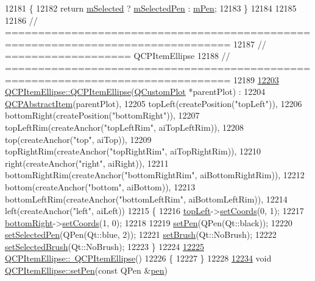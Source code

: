 \begin{DoxyCode}
12181 \textcolor{keyword}{}\{
12182   \textcolor{keywordflow}{return} \hyperlink{a00022_a4bdb3457dad1d268c0f78a44152b9645}{mSelected} ? \hyperlink{a00036_aff858ad6dde3b90024814ca4b116f278}{mSelectedPen} : \hyperlink{a00036_abbb544d5bb927dfe4e81a7f3ca4c65ac}{mPen};
12183 \}
12184 
12185 
12186 \textcolor{comment}{// ================================================================================}
12187 \textcolor{comment}{// =================== QCPItemEllipse}
12188 \textcolor{comment}{// ================================================================================}
12189 
\hypertarget{a00115_source_l12203}{}\hyperlink{a00035_a759b77ef002515eba0263b5447ecb3fb}{12203} \hyperlink{a00035_a759b77ef002515eba0263b5447ecb3fb}{QCPItemEllipse::QCPItemEllipse}(\hyperlink{a00030_d8/d00/a00186}{QCustomPlot} *parentPlot) :
12204   \hyperlink{a00022}{QCPAbstractItem}(parentPlot),
12205   topLeft(createPosition(\textcolor{stringliteral}{"topLeft"})),
12206   bottomRight(createPosition(\textcolor{stringliteral}{"bottomRight"})),
12207   topLeftRim(createAnchor(\textcolor{stringliteral}{"topLeftRim"}, aiTopLeftRim)),
12208   top(createAnchor(\textcolor{stringliteral}{"top"}, aiTop)),
12209   topRightRim(createAnchor(\textcolor{stringliteral}{"topRightRim"}, aiTopRightRim)),
12210   right(createAnchor(\textcolor{stringliteral}{"right"}, aiRight)),
12211   bottomRightRim(createAnchor(\textcolor{stringliteral}{"bottomRightRim"}, aiBottomRightRim)),
12212   bottom(createAnchor(\textcolor{stringliteral}{"bottom"}, aiBottom)),
12213   bottomLeftRim(createAnchor(\textcolor{stringliteral}{"bottomLeftRim"}, aiBottomLeftRim)),
12214   left(createAnchor(\textcolor{stringliteral}{"left"}, aiLeft))
12215 \{
12216   \hyperlink{a00035_a12fd8420c06718d0c8a2303d6a652848}{topLeft}->\hyperlink{a00038_aa988ba4e87ab684c9021017dcaba945f}{setCoords}(0, 1);
12217   \hyperlink{a00035_ab73c8deafc0d8d1ef7d75b6cdcc37159}{bottomRight}->\hyperlink{a00038_aa988ba4e87ab684c9021017dcaba945f}{setCoords}(1, 0);
12218   
12219   \hyperlink{a00035_adb81a663ed2420fcfa011e49f678d1a6}{setPen}(QPen(Qt::black));
12220   \hyperlink{a00035_a6c542fba1dc918041c583f58a50dde99}{setSelectedPen}(QPen(Qt::blue, 2));
12221   \hyperlink{a00035_a49fc74e6965834e873d027d026def798}{setBrush}(Qt::NoBrush);
12222   \hyperlink{a00035_a9693501cfaa43a099655c75bed0dab3f}{setSelectedBrush}(Qt::NoBrush);
12223 \}
12224 
\hypertarget{a00115_source_l12225}{}\hyperlink{a00035_a3c17073a1805d32b4e09b6ccde0bef76}{12225} \hyperlink{a00035_a3c17073a1805d32b4e09b6ccde0bef76}{QCPItemEllipse::~QCPItemEllipse}()
12226 \{
12227 \}
12228 
\hypertarget{a00115_source_l12234}{}\hyperlink{a00035_adb81a663ed2420fcfa011e49f678d1a6}{12234} \textcolor{keywordtype}{void} \hyperlink{a00035_adb81a663ed2420fcfa011e49f678d1a6}{QCPItemEllipse::setPen}(\textcolor{keyword}{const} QPen &\hyperlink{a00116_a1f13fffa0a0faac34ec342973e613a4a}{pen})

\end{DoxyCode}
